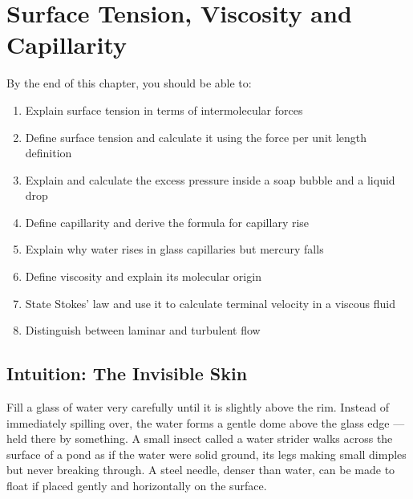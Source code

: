 %

\chapter{Surface Tension, Viscosity and Capillarity}
\label{ch:surface_tension}
\minitoc
\newpage


\begin{objectivebox}
By the end of this chapter, you should be able to:
\begin{enumerate}[noitemsep]
  \item Explain surface tension in terms of
  intermolecular forces
  \item Define surface tension and calculate it
  using the force per unit length definition
  \item Explain and calculate the excess pressure
  inside a soap bubble and a liquid drop
  \item Define capillarity and derive the formula
  for capillary rise
  \item Explain why water rises in glass capillaries
  but mercury falls
  \item Define viscosity and explain its molecular
  origin
  \item State Stokes' law and use it to calculate
  terminal velocity in a viscous fluid
  \item Distinguish between laminar and turbulent
  flow
\end{enumerate}
\end{objectivebox}

\section{Intuition: The Invisible Skin}

Fill a glass of water very carefully until it is
slightly above the rim. Instead of immediately
spilling over, the water forms a gentle dome above
the glass edge --- held there by something. A small
insect called a water strider walks across the surface
of a pond as if the water were solid ground, its legs
making small dimples but never breaking through.
A steel needle, denser than water, can be made to
float if placed gently and horizontally on the surface.


